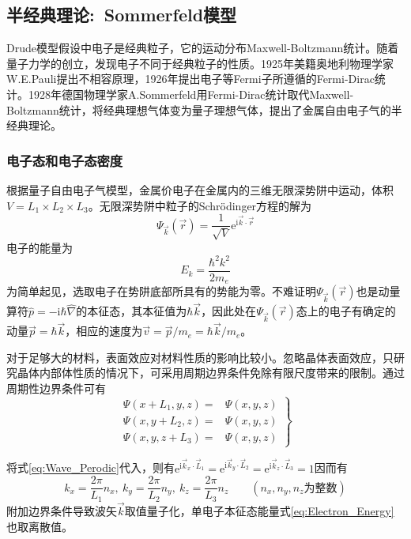 \subsection{半经典理论:~Sommerfeld模型}\label{subsec:Sommerfeld-Model} 
Drude模型假设中电子是经典粒子，它的运动分布Maxwell-Boltzmann统计。随着量子力学的创立，发现电子不同于经典粒子的性质。1925年美籍奥地利物理学家W.E.Pauli提出不相容原理，1926年提出电子等Fermi子所遵循的Fermi-Dirac统计。1928年德国物理学家A.Sommerfeld用Fermi-Dirac统计取代Maxwell-Boltzmann统计，将经典理想气体变为量子理想气体，提出了金属自由电子气的半经典理论。

\subsubsection{电子态和电子态密度} 
根据量子自由电子气模型，金属价电子在金属内的三维无限深势阱中运动，体积$V=L_1\times L_2\times L_3$。无限深势阱中粒子的Schr\"odinger方程的解为
\begin{equation}
	\Psi_{\vec k}(\vec r)=\dfrac1{\sqrt V}\mathrm{e}^{\mathrm{i}\vec k\cdot\vec r}
	\label{eq:Schrodinger-3D}
\end{equation} 
电子的能量为 
\begin{equation}
	E_k=\dfrac{\hbar^2k^2}{2m_e}
	\label{eq:Electron_Energy}
\end{equation}
为简单起见，选取电子在势阱底部所具有的势能为零。不难证明$\Psi_{\vec k}(\vec r)$也是动量算符$\hat p=-\mathrm{i}\hbar\hat{\nabla}$的本征态，其本征值为$\hbar\vec k$，因此处在$\Psi_{\vec k}(\vec r)$态上的电子有确定的动量$\vec p=\hbar\vec k$，相应的速度为$\vec v=\vec p/m_e=\hbar\vec k/m_e$。

对于足够大的材料，表面效应对材料性质的影响比较小。忽略晶体表面效应，只研究晶体内部体性质的情况下，可采用周期边界条件免除有限尺度带来的限制。通过周期性边界条件可有
\begin{equation}
	\left.\begin{aligned}
	\Psi(x+L_1,y,z)=&\Psi(x,y,z)	\\
	\Psi(x,y+L_2,z)=&\Psi(x,y,z)	\\
	\Psi(x,y,z+L_3)=&\Psi(x,y,z)
\end{aligned}\right\}
	\label{eq:Wave_Perodic}
\end{equation}

将式\eqref{eq:Wave_Perodic}代入，则有$\mathrm{e}^{\mathrm{i}\vec k_x\cdot\vec L_1}=\mathrm{e}^{\mathrm{i}\vec k_y\cdot\vec L_2}=\mathrm{e}^{\mathrm{i}\vec k_z\cdot\vec L_3}=1$因而有
\begin{equation}
	k_x=\dfrac{2\pi}{L_1}n_x,~k_y=\dfrac{2\pi}{L_2}n_y,~k_z=\dfrac{2\pi}{L_3}n_z \qquad (n_x,n_y,n_z\mbox{为整数})
	\label{eq:Perodic_Condition}
\end{equation}
附加边界条件导致波矢$\vec k$取值量子化，单电子本征态能量式\eqref{eq:Electron_Energy}也取离散值。

